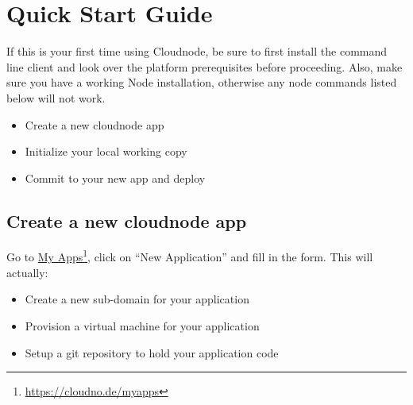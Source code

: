 
\def\mytitle{Cloudnode User's Guide}
\def\subtitle{Version 1.0}
\def\myauthor{Hans J Schroeder}
\def\affiliation{http:/\slash cloudno.de\slash }
\def\htmlheader{$<$script type="text\slash javascript"
src="http:/\slash cdn.mathjax.org\slash mathjax\slash latest\slash MathJax.js?config=TeX-AMS-MML\_HTMLorMML"$>$
$<$\slash script$>$}
\def\latexmode{memoir}

\chapter{Quick Start Guide}
\label{quickstartguide}
\setlength{\parindent}{0in}
\setlength{\parskip}{5pt}

If this is your first time using Cloudnode, be sure to first install the command line client and look over the platform prerequisites before proceeding. Also, make sure you have a working Node installation, otherwise any node commands listed below will not work.

\begin{itemize}
\item Create a new cloudnode app

\item Initialize your local working copy

\item Commit to your new app and deploy

\end{itemize}



\section{Create a new cloudnode app}
\label{createanewcloudnodeapp}

Go to \href{https://cloudno.de/myapps}{My Apps}\footnote{\href{https://cloudno.de/myapps}{https:/\slash cloudno.de\slash myapps}}, click on ``New Application'' and fill in the form. This will actually:

\begin{itemize}
\item Create a new sub-domain for your application

\item Provision a virtual machine for your application

\item Setup a git repository to hold your application code

\end{itemize}




